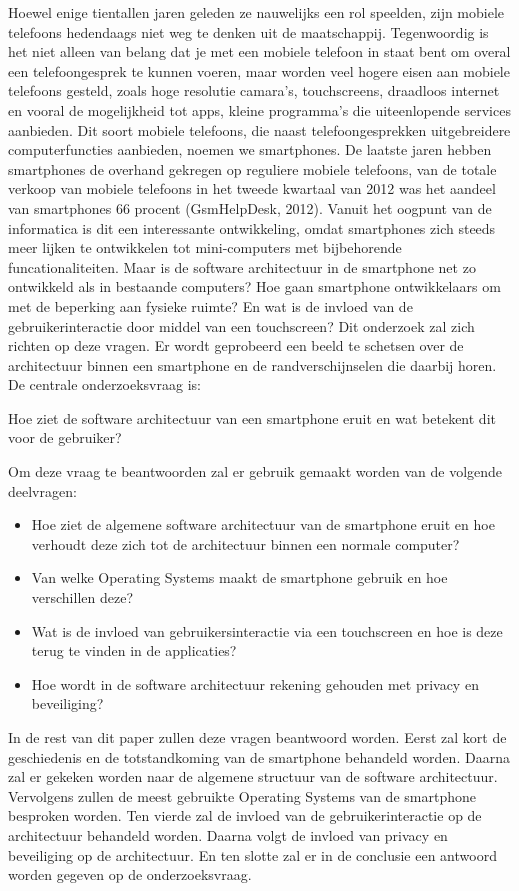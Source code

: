 Hoewel enige tientallen jaren geleden ze nauwelijks een rol speelden, zijn mobiele telefoons hedendaags niet weg te denken uit de maatschappij.
Tegenwoordig is het niet alleen van belang dat je met een mobiele telefoon in staat bent om overal een telefoongesprek te kunnen voeren, maar worden veel hogere eisen aan mobiele telefoons gesteld, zoals hoge resolutie camara's, touchscreens, draadloos internet en vooral de mogelijkheid tot apps, kleine programma's die uiteenlopende services aanbieden.
Dit soort mobiele telefoons, die naast telefoongesprekken uitgebreidere computerfuncties aanbieden, noemen we smartphones.
De laatste jaren hebben smartphones de overhand gekregen op reguliere mobiele telefoons, van de totale verkoop van mobiele telefoons in het tweede kwartaal van 2012 was het aandeel van smartphones 66 procent (GsmHelpDesk, 2012).
Vanuit het oogpunt van de informatica is dit een interessante ontwikkeling, omdat smartphones zich steeds meer lijken te ontwikkelen tot mini-computers met bijbehorende funcationaliteiten.
Maar is de software architectuur in de smartphone net zo ontwikkeld als in bestaande computers?
Hoe gaan smartphone ontwikkelaars om met de beperking aan fysieke ruimte?
En wat is de invloed van de gebruikerinteractie door middel van een touchscreen?
Dit onderzoek zal zich richten op deze vragen.
Er wordt geprobeerd een beeld te schetsen over de architectuur binnen een smartphone en de randverschijnselen die daarbij horen.
De centrale onderzoeksvraag is: 

Hoe ziet de software architectuur van een smartphone eruit en wat betekent dit voor de gebruiker?

Om deze vraag te beantwoorden zal er gebruik gemaakt worden van de volgende deelvragen:

\begin{itemize}
   \item Hoe ziet de algemene software architectuur van de smartphone eruit en hoe verhoudt deze zich tot de architectuur binnen een normale computer?
   \item Van welke Operating Systems maakt de smartphone gebruik en hoe verschillen deze?
   \item Wat is de invloed van gebruikersinteractie via een touchscreen en hoe is deze terug te vinden in de applicaties?
   \item Hoe wordt in de software architectuur rekening gehouden met privacy en beveiliging?
\end{itemize}

In de rest van dit paper zullen deze vragen beantwoord worden.
Eerst zal kort de geschiedenis en de totstandkoming van de smartphone behandeld worden.
Daarna zal er gekeken worden naar de algemene structuur van de software architectuur.
Vervolgens zullen de meest gebruikte Operating Systems van de smartphone besproken worden.
Ten vierde zal de invloed van de gebruikerinteractie op de architectuur behandeld worden.
Daarna volgt de invloed van privacy en beveiliging op de architectuur.
En ten slotte zal er in de conclusie een antwoord worden gegeven op de onderzoeksvraag.

